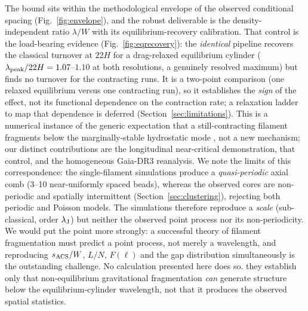 \documentclass[usenatbib,twoside,twocolumn]{mnras}
\begin{document}
The bound sits within the methodological envelope of the observed conditional spacing (Fig.~\ref{fig:envelope}), and the robust deliverable is the density-independent ratio $\lambda/W$ with its equilibrium-recovery calibration. That control is the load-bearing evidence (Fig.~\ref{fig:eqrecovery}): the \emph{identical} pipeline recovers the classical turnover at $22H$ for a drag-relaxed equilibrium cylinder ($\lambda_{\rm peak}/22H=1.07$--$1.10$ at both resolutions, a genuinely resolved maximum) but finds no turnover for the contracting runs. It is a two-point comparison (one relaxed equilibrium versus one contracting run), so it establishes the \emph{sign} of the effect, not its functional dependence on the contraction rate; a relaxation ladder to map that dependence is deferred (Section~\ref{sec:limitations}). This is a numerical instance of the generic expectation that a still-contracting filament fragments below the marginally-stable hydrostatic mode \citep{Clarke2016,Clarke2017,Clarke2020}, not a new mechanism; our distinct contributions are the longitudinal near-critical demonstration, that control, and the homogeneous Gaia-DR3 reanalysis. We note the limits of this correspondence: the single-filament simulations produce a \emph{quasi-periodic} axial comb (3--10 near-uniformly spaced beads), whereas the observed cores are non-periodic and spatially intermittent (Section~\ref{sec:clustering}), rejecting both periodic and Poisson models. The simulations therefore reproduce a \emph{scale} (sub-classical, order $\lambda_{\rm J}$) but neither the observed point process nor its non-periodicity. We would put the point more strongly: a successful theory of filament fragmentation must predict a point process, not merely a wavelength, and reproducing $s_{\rm ACS}/W$, $L/N$, $F(\ell)$ and the gap distribution simultaneously is the outstanding challenge. No calculation presented here does so. they establish only that non-equilibrium gravitational fragmentation \emph{can} generate structure below the equilibrium-cylinder wavelength, not that it produces the observed spatial statistics.
\end{document}
